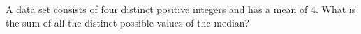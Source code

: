A data set consists of four distinct positive integers and has a mean of $4$. What is the sum of all the distinct possible values of the median?
